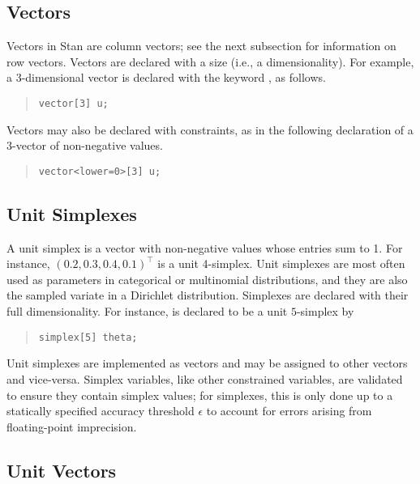 \subsection{Vectors}

Vectors in Stan are column vectors; see the next subsection for
information on row vectors.  Vectors are declared with a size (i.e., a
dimensionality).  For example, a 3-dimensional vector is declared with
the keyword , as follows.
%
\begin{quote}
\begin{Verbatim}
vector[3] u;
\end{Verbatim}
\end{quote}
%
Vectors may also be declared with constraints, as in the following
declaration of a 3-vector of non-negative values.
%
\begin{quote}
\begin{Verbatim}
vector<lower=0>[3] u;
\end{Verbatim}
\end{quote}
%




\subsection{Unit Simplexes}

A unit simplex is a vector with non-negative values whose entries sum
to 1.  For instance, $(0.2,0.3,0.4,0.1)^{\top}$ is a unit 4-simplex.
Unit simplexes are most often used as parameters in categorical
or multinomial distributions, and they are also the sampled variate in
a Dirichlet distribution.  Simplexes are declared with their full
dimensionality.  For instance,  is declared to
be a unit $5$-simplex by
%
\begin{quote}
\begin{Verbatim} 
simplex[5] theta;
\end{Verbatim}
\end{quote}
% 

Unit simplexes are implemented as vectors and may be assigned to other
vectors and vice-versa.  Simplex variables, like other constrained
variables, are validated to ensure they contain simplex values; for
simplexes, this is only done up to a statically specified accuracy
threshold $\epsilon$ to account for errors arising from floating-point
imprecision.

\subsection{Unit Vectors}

